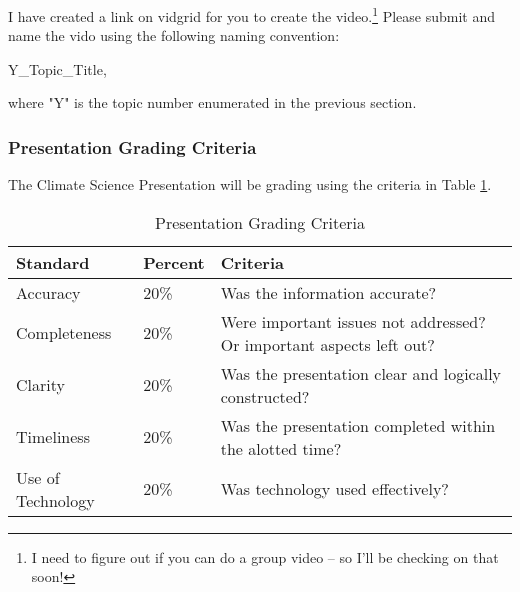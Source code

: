 
I have created a link on vidgrid for you to create the video.\footnote{I need to figure out if you can do a group video -- so I'll be checking on that soon!} Please submit and name the vido using the following naming convention: 

\noindent Y\_Topic\_Title,

where "Y" is the topic number enumerated in the previous section. 



\subsubsection{Presentation Grading Criteria}

The Climate Science Presentation will be grading using the criteria in Table \ref{tab:presentationgrading}.

\begin{table}[h]
\centering
\caption{Presentation Grading Criteria}
\label{tab:presentationgrading}
\begin{tabular}{llp{2.5in}}\hline
Standard            & Percent & Criteria \\ \hline\hline    
Accuracy            & 20\%    & Was the information accurate?\\
Completeness        & 20\%    & Were important issues not addressed? Or important aspects left out?\\
Clarity             & 20\% & Was the presentation clear and logically constructed?\\
Timeliness          & 20\% & Was the presentation completed within the alotted time? \\
Use of Technology   & 20\% & Was technology used effectively?\\ \hline
\end{tabular}
\end{table}
